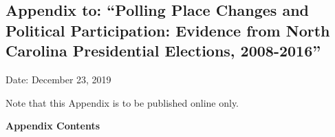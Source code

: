 \documentclass{cup_PSRM}
\begin{document}

\clearpage
\normalsize
\onehalfspacing

\appendix
\setcounter{page}{1}



\begin{centering}

\section*{\normalfont \LARGE Appendix to:  ``Polling Place Changes and Political Participation: Evidence from North Carolina Presidential Elections, 2008-2016''}


	\vspace{.15in} \large




	\large
	\vspace{.2in}
	Date: December 23, 2019


	\large
	\vspace{.2in}

	\normalsize
	\vspace*{.2in}
	Note that this Appendix is to be published online only.
  \vspace*{.2in}

\end{centering}


\setcounter{footnote}{0}
\setcounter{equation}{0}
\renewcommand{\thesubsection}{\Alph{subsection}}



\vspace{.2in}
\noindent \textbf{Appendix Contents}

\vspace*{.1in}
\end{document}
